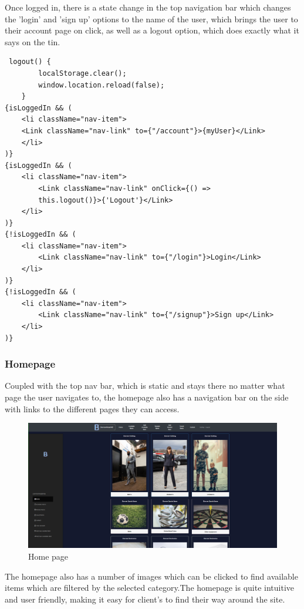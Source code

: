 Once logged in, there is a state change in the top navigation bar which changes the 'login' and 'sign up' options to the name of the user, which brings the user to their account page on click, as well as a logout option, which does exactly what it says on the tin.

\begin{verbatim}
 logout() {
        localStorage.clear();
        window.location.reload(false);
    }
{isLoggedIn && (
    <li className="nav-item">
    <Link className="nav-link" to={"/account"}>{myUser}</Link>
    </li>
)}
{isLoggedIn && (
    <li className="nav-item">
        <Link className="nav-link" onClick={() => 
        this.logout()}>{'Logout'}</Link>
    </li>
)}
{!isLoggedIn && (
    <li className="nav-item">
        <Link className="nav-link" to={"/login"}>Login</Link>
    </li>
)}
{!isLoggedIn && (
    <li className="nav-item">
        <Link className="nav-link" to={"/signup"}>Sign up</Link>
    </li>
)}
\end{verbatim}

\subsubsection{Homepage}
Coupled with the top nav bar, which is static and stays there no matter what page the user navigates to, the homepage also has a navigation bar on the side with links to the different pages they can access.

\begin{figure}[ht]
\renewcommand\thefigure{4.3}
\centering
\includegraphics[scale=0.3]{img/fe_homepage.PNG}
\caption{Home page}
\label{HomePage}
\end{figure}

\par
The homepage also has a number of images which can be clicked to find available items which are filtered by the selected category.The homepage is quite intuitive and user friendly, making it easy for client's to find their way around the site.  

